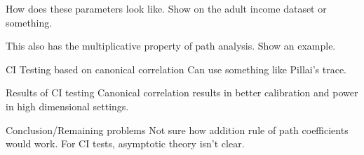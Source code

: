 \documentclass{beamer}
\begin{document}
\begin{frame}
	How does these parameters look like. Show on the adult income dataset
	or something.

	This also has the multiplicative property of path analysis. Show an
	example.
\end{frame}

\begin{frame}{CI Testing based on canonical correlation}
	Can use something like Pillai's trace.
\end{frame}

\begin{frame}{Results of CI testing}
	Canonical correlation results in better calibration and power in high
	dimensional settings.
\end{frame}

\begin{frame}{Conclusion/Remaining problems}
	Not sure how addition rule of path coefficients would work.
	For CI tests, asymptotic theory isn't clear.
\end{frame}
\end{document}
